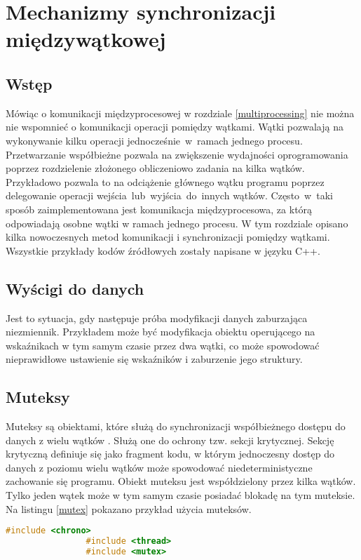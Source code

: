\newpage
\section{Mechanizmy synchronizacji międzywątkowej}\label{threading}
{
    \subsection{Wstęp}
    {
        Mówiąc o komunikacji międzyprocesowej w rozdziale \ref{multiprocessing} nie można nie wspomnieć o komunikacji operacji pomiędzy wątkami. Wątki pozwalają na wykonywanie kilku operacji jednocześnie~w~ramach jednego procesu. Przetwarzanie współbieżne pozwala na zwiększenie wydajności oprogramowania poprzez rozdzielenie złożonego obliczeniowo zadania na kilka wątków. Przykładowo pozwala to na odciążenie głównego wątku programu poprzez delegowanie operacji wejścia~lub~wyjścia~do~innych wątków. Często~w~taki sposób zaimplementowana jest komunikacja międzyprocesowa, za którą odpowiadają osobne wątki w ramach jednego procesu. W tym rozdziale opisano kilka nowoczesnych metod komunikacji i synchronizacji pomiędzy wątkami. Wszystkie przykłady kodów źródłowych zostały napisane w języku C++.
    }
    \subsection{Wyścigi do danych}
    {
        Jest to sytuacja, gdy następuje próba modyfikacji danych zaburzająca niezmiennik.
        Przykładem może być modyfikacja obiektu operującego na wskaźnikach w tym samym czasie przez dwa wątki, co może spowodować nieprawidłowe ustawienie się wskaźników i zaburzenie jego struktury.
    }
    \subsection{Muteksy}
    {
        Muteksy są obiektami, które służą do synchronizacji współbieżnego dostępu do danych z wielu wątków \cite{threads_williams}. Służą one do ochrony tzw. sekcji krytycznej. Sekcję krytyczną definiuje się jako fragment kodu, w którym jednoczesny dostęp do danych z poziomu wielu wątków może spowodować niedeterministyczne zachowanie się programu. Obiekt muteksu jest współdzielony przez kilka wątków. Tylko jeden wątek może w tym samym czasie posiadać blokadę na tym muteksie.
        Na listingu \ref{mutex} pokazano przykład użycia muteksów.

        \begin{lstlisting}[caption=Przykład użycia muteksów w języku C++, language=C++, label=mutex]
                #include <chrono>
                #include <thread>
                #include <mutex>
                 

\end{lstlisting}}}
